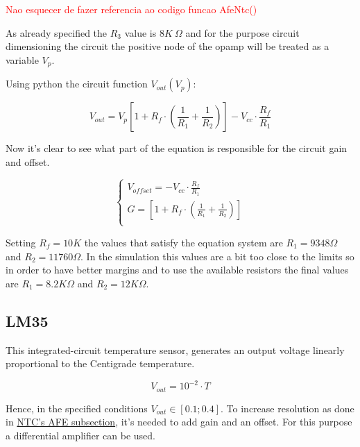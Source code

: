 \documentclass[12pt]{article}
\begin{document}
    \textcolor{red}{Nao esquecer de fazer referencia ao codigo funcao AfeNtc()}

    As already specified the $R_3$ value is $8K~\Omega$ and for the purpose circuit dimensioning the circuit 
    the positive node of the opamp will be treated as a variable $V_p$.

    Using python the circuit function $V_{out}(V_p)$:
    
    \begin{equation}
        V_{out} = V_p\left[ 1 + R_f\cdot\left(\frac{1}{R_1} + \frac{1}{R_2}\right) \right] - V_{cc}\cdot\frac{R_f}{R_1}
    \end{equation}

    Now it's clear to see what part of the equation is responsible for the circuit gain and offset.
    
    \begin{equation}
        \begin{cases}
            V_{offset} = - V_{cc}\cdot\frac{R_f}{R_1}\\
            G = \left[ 1 + R_f\cdot\left(\frac{1}{R_1} + \frac{1}{R_2}\right) \right]\\
        \end{cases}
    \end{equation}

    Setting $R_f = 10K$ the values that satisfy the equation system are $R_1 = 9348 \Omega$ and $R_2 = 11760 \Omega$.
    In the simulation this values are a bit too close to the limits so in order to have better margins and to use the available resistors
    the final values are  $R_1 = 8.2K \Omega$ and $R_2 = 12K \Omega$.

\subsection{LM35}

    This integrated-circuit temperature sensor, generates an output
    voltage linearly proportional to the Centigrade temperature.

    $$V_{out} = 10^{-2}\cdot T$$

    Hence, in the specified conditions $V_{out}\in[0.1;0.4]$. 
    To increase resolution as done in \hyperref[ AFENTC ]{NTC's AFE subsection},
    it's needed to add gain and an offset. 
    For this purpose a differential amplifier can be used.  
    
\end{document}
